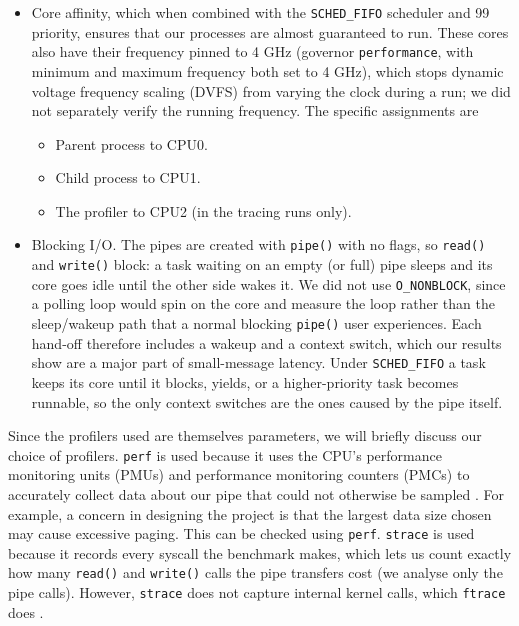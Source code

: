 \documentclass[11pt,sigconf,nonacm]{acmart}
\begin{document}
\begin{itemize}
    \item Core affinity, which when combined with the \texttt{SCHED\_FIFO} scheduler and 99 priority, ensures that our processes are almost guaranteed to run. These cores also have their frequency pinned to 4 GHz (governor \texttt{performance}, with minimum and maximum frequency both set to 4 GHz), which stops dynamic voltage frequency scaling (DVFS) from varying the clock during a run; we did not separately verify the running frequency. The specific assignments are
    \begin{itemize}
        \item Parent process to CPU0.
        \item Child process to CPU1.
        \item The profiler to CPU2 (in the tracing runs only).
    \end{itemize}
    \item Blocking I/O. The pipes are created with \texttt{pipe()} with no flags, so \texttt{read()} and \texttt{write()} block: a task waiting on an empty (or full) pipe sleeps and its core goes idle until the other side wakes it. We did not use \texttt{O\_NONBLOCK}, since a polling loop would spin on the core and measure the loop rather than the sleep/wakeup path that a normal blocking \texttt{pipe()} user experiences. Each hand-off therefore includes a wakeup and a context switch, which our results show are a major part of small-message latency. Under \texttt{SCHED\_FIFO} a task keeps its core until it blocks, yields, or a higher-priority task becomes runnable, so the only context switches are the ones caused by the pipe itself.
\end{itemize}

Since the profilers used are themselves parameters, we will briefly discuss our choice of profilers. \texttt{perf} is used because it uses the CPU's performance monitoring units (PMUs) and performance monitoring counters (PMCs) to accurately collect data about our pipe that could not otherwise be sampled \cite{redhat_perf_raw_events}. For example, a concern in designing the project is that the largest data size chosen may cause excessive paging. This can be checked using \texttt{perf}. \texttt{strace} is used because it records every syscall the benchmark makes, which lets us count exactly how many \texttt{read()} and \texttt{write()} calls the pipe transfers cost (we analyse only the pipe calls). However, \texttt{strace} does not capture internal kernel calls, which \texttt{ftrace} does \cite{so:ftrace_vs_strace}.
\end{document}
